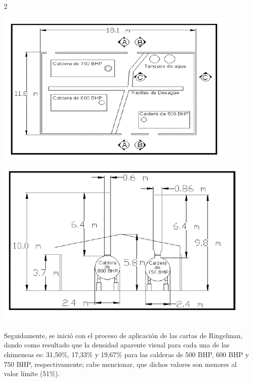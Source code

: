 \documentclass[12pt,spanish,Letterpaper,openany]{book}
\begin{document}
\begin {multicols}{2}
\begin {flushleft}
\noindent\begin{minipage}[c]{\columnwidth}

\centering

\includegraphics[width=1\linewidth]{images/image02_wvaliente}

\centering

\includegraphics[width=0.82\linewidth]{images/image03_wvaliente}

\end{minipage}

\end {flushleft}

Seguidamente, se inició con el proceso de aplicación de las cartas de Ringelman, dando como resultado que la densidad aparente visual para cada una de las chimeneas es: 31,50\%, 17,33\% y 19,67\% para las calderas de 500 BHP, 600 BHP y 750 BHP, respectivamente; cabe mencionar, que dichos valores son menores al valor límite (51\%).


\end{multicols}
\end{document}
